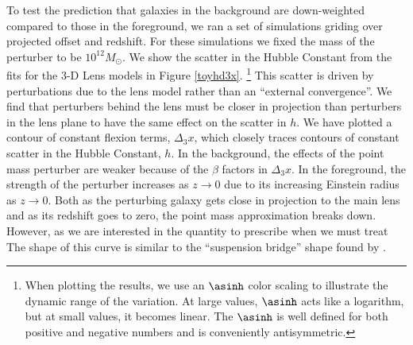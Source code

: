 To test the prediction that galaxies in the background are down-weighted compared to those in the foreground, we ran a set of simulations griding over projected offset and redshift. For these simulations we fixed the mass of the perturber to be $10^{12} M_\odot$. We show the scatter in the Hubble Constant from the fits for the 3-D Lens models in Figure \ref{toyhd3x}. \footnote{When plotting the results, we use an $\asinh$ color scaling to illustrate the dynamic range of the variation. At large values, $\asinh$ acts like a logarithm, but at small values, it becomes linear. The $\asinh$ is well defined for both positive and negative numbers and is conveniently antisymmetric.} This scatter is driven by perturbations due to the lens model rather than an ``external convergence''. We find that perturbers behind the lens must be closer in projection than perturbers in the lens plane to have the same effect on the scatter in $h$. We have plotted a contour of constant flexion terms, $\Delta_3 x$, which closely traces contours of constant scatter in the Hubble Constant, $h$. In the background, the effects of the point mass perturber are weaker because of the $\beta$ factors in $\Delta_3 x$. In the foreground, the strength of the perturber increases as $z \rightarrow 0$ due to its increasing Einstein radius as $z \rightarrow 0$. Both as the perturbing galaxy gets close in projection to the main lens and as its redshift goes to zero, the point mass approximation breaks down. However, as we are interested in the quantity to prescribe when we must treat The shape of this curve is similar to the ``suspension bridge'' shape found by \citet{Momcheva06}.